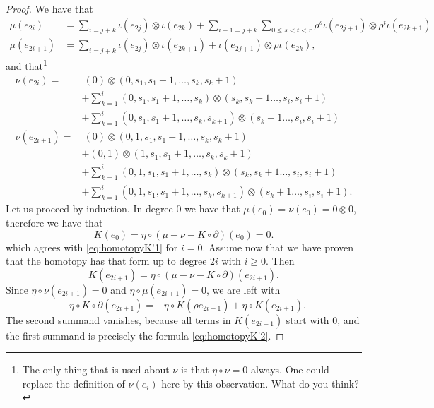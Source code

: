 \begin{proof}
	We have that
	\begin{align*}
		\mu(e_{2i}) &= \sum_{i=j+k} \iota(e_{2j})\otimes \iota(e_{2k}) + \sum_{i-1=j+k}\sum_{0\leq s<t<r} \rho^s\iota(e_{2j+1})\otimes \rho^t\iota(e_{2k+1}) \\
		\mu(e_{2i+1}) &= \sum_{i=j+k} \iota(e_{2j})\otimes \iota(e_{2k+1}) + \iota(e_{2j+1})\otimes \rho \iota(e_{2k}),
	\end{align*}
	and that\footnote{The only thing that is used about $\nu$ is that $\eta\circ \nu = 0$ always.
		One could replace the definition of $\nu(e_i)$ here by this observation.
		What do you think?}
	\begin{align*}
		\nu(e_{2i}) =&\  (0)\otimes(0,s_1,s_1+1,\ldots,s_k,s_k+1) \\
		&+ \sum_{k=1}^i(0,s_1,s_1+1,\ldots,s_k)\otimes(s_k,s_k+1\ldots,s_i,s_i+1) \\
		&+ \sum_{k=1}^i(0,s_1,s_1+1,\ldots,s_k,s_{k+1})\otimes(s_k+1\ldots,s_i,s_i+1) \\
		\nu(e_{2i+1}) =&\ (0)\otimes(0,1,s_1,s_1+1,\ldots,s_k,s_k+1) \\
		&+ (0,1)\otimes(1,s_1,s_1+1,\ldots,s_k,s_k+1) \\
		&+ \sum_{k=1}^i(0,1,s_1,s_1+1,\ldots,s_k)\otimes(s_k,s_k+1\ldots,s_i,s_i+1) \\
		&+ \sum_{k=1}^i(0,1,s_1,s_1+1,\ldots,s_k,s_{k+1})\otimes(s_k+1\ldots,s_i,s_i+1).
	\end{align*}
	Let us proceed by induction.
	In degree $0$ we have that $\mu(e_0) = \nu(e_0) = 0\otimes 0$, therefore we have that
	\[K(e_0) = \eta\circ (\mu-\nu-K\circ\partial)(e_0) = 0.\]
	which agrees with \eqref{eq:homotopyK'1} for $i=0$.
	Assume now that we have proven that the homotopy has that form up to degree $2i$ with $i\geq 0$.
	Then
	\[K(e_{2i+1}) = \eta\circ (\mu-\nu-K\circ\partial)(e_{2i+1}).\]
	Since $\eta\circ \nu(e_{2i+1}) = 0$ and $\eta\circ\mu(e_{2i+1}) = 0$, we are left with
	\[-\eta\circ K\circ\partial(e_{2i+1}) = -\eta\circ K (\rho e_{2i+1}) + \eta\circ K (e_{2i+1}).
	\]
	The second summand vanishes, because all terms in $K(e_{2i+1})$ start with $0$, and the first summand is precisely the formula \eqref{eq:homotopyK'2}.


\end{proof}
